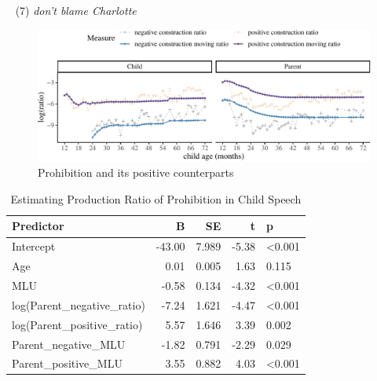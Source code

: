 \documentclass[
  english,
  man,floatsintext]{apa6}
\begin{document}
~
(7) \emph{don't blame Charlotte}

\begin{figure}[H]

{\centering \includegraphics{neg_construction_article_files/figure-latex/prohibition-1} 

}

\caption{Prohibition and its positive counterparts}\label{fig:prohibition}
\end{figure}

\clearpage

\begin{table}

\caption{\label{tab:unnamed-chunk-4}Estimating Production Ratio of Prohibition in Child Speech}
\centering
\begin{tabular}[t]{l|r|r|r|l}
\hline
Predictor & B & SE & t & p\\
\hline
Intercept & -43.00 & 7.989 & -5.38 & <0.001\\
\hline
Age & 0.01 & 0.005 & 1.63 & 0.115\\
\hline
MLU & -0.58 & 0.134 & -4.32 & <0.001\\
\hline
log(Parent\_negative\_ratio) & -7.24 & 1.621 & -4.47 & <0.001\\
\hline
log(Parent\_positive\_ratio) & 5.57 & 1.646 & 3.39 & 0.002\\
\hline
Parent\_negative\_MLU & -1.82 & 0.791 & -2.29 & 0.029\\
\hline
Parent\_positive\_MLU & 3.55 & 0.882 & 4.03 & <0.001\\
\hline
\end{tabular}
\end{table}
\end{document}
